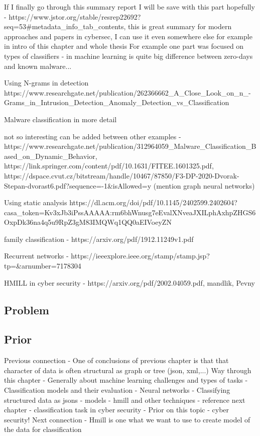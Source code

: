 If I finally go through this summary report I will be save with this part hopefully - https://www.jstor.org/stable/resrep22692?seq=53#metadata_info_tab_contents, this is great summary for modern approaches and papers in cybersec, I can use it even somewhere else for example in intro of this chapter and whole thesis
For example one part was focused on types of classifiers - in machine learning is quite big difference between zero-days and known malware...

Using N-grams in detection https://www.researchgate.net/publication/262366662_A_Close_Look_on_n_-Grams_in_Intrusion_Detection_Anomaly_Detection_vs_Classification

Malware classification in more detail

not so interesting can be added between other examples - https://www.researchgate.net/publication/312964059_Malware_Classification_Based_on_Dynamic_Behavior, https://link.springer.com/content/pdf/10.1631/FITEE.1601325.pdf, https://dspace.cvut.cz/bitstream/handle/10467/87850/F3-DP-2020-Dvorak-Stepan-dvorast6.pdf?sequence=-1&isAllowed=y (mention graph neural networks)

Using static analysis https://dl.acm.org/doi/pdf/10.1145/2402599.2402604?casa_token=Kv3xJb3iPssAAAAA:rm6bhWnusg7eEvalXNveaJXILphAxhpZHGS6OxpDk36na4q5u9RpZ3gM83IMQWq1QQ0aEIVoeyZN

family classification - https://arxiv.org/pdf/1912.11249v1.pdf

Recurrent networks - https://ieeexplore.ieee.org/stamp/stamp.jsp?tp=&arnumber=7178304

HMILL in cyber security - https://arxiv.org/pdf/2002.04059.pdf, mandlik, Pevny

\subsection{Problem}
\subsection{Prior}






Previous connection
- One of conclusions of previous chapter is that that character of data is often structural as graph or tree (json, xml,...)
Way through this chapter
- Generally about machine learning challenges and types of tasks
- Classification models and their evaluation
- Neural networks
- Classifying structured data as jsons - models
    - hmill and other techniques - reference next chapter
- classification task in cyber security
- Prior on this topic - cyber security!
Next connection
- Hmill is one what we want to use to create model of the data for classification


